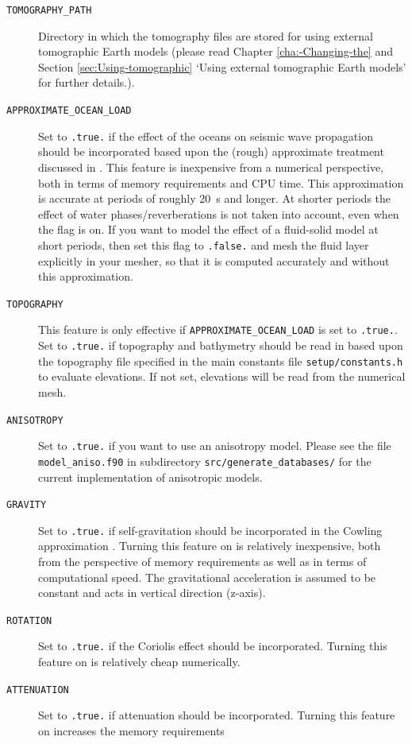 \begin{description}
\item [{\texttt{TOMOGRAPHY\_PATH}}] Directory in which the tomography files
are stored for using external tomographic Earth models (please read
Chapter \ref{cha:-Changing-the} and Section \ref{sec:Using-tomographic}
`Using external tomographic Earth models' for further details.).
%
\item [{\texttt{APPROXIMATE\_OCEAN\_LOAD}}] Set to \texttt{.true.} if the
effect of the oceans on seismic wave propagation should be incorporated
based upon the (rough) approximate treatment discussed in \citet{KoTr02b}.
This feature is inexpensive from a numerical perspective, both in
terms of memory requirements and CPU time. This approximation is accurate
at periods of roughly 20~s and longer. At shorter periods the effect
of water phases/reverberations is not taken into account, even when
the flag is on. If you want to model the effect of a fluid-solid model
at short periods, then set this flag to \texttt{.false.} and mesh
the fluid layer explicitly in your mesher, so that it is computed
accurately and without this approximation.
%
\item [{\texttt{TOPOGRAPHY}}] This feature is only effective if \texttt{APPROXIMATE\_OCEAN\_LOAD}
is set to \texttt{.true.}. Set to \texttt{.true.} if topography and
bathymetry should be read in based upon the topography file specified
in the main constants file \texttt{setup/constants.h} to evaluate elevations. If not set, elevations
will be read from the numerical mesh.
%
\item [{\texttt{ANISOTROPY}}] Set to \texttt{.true.} if you want to use
an anisotropy model. Please see the file \texttt{model\_aniso.f90}
in subdirectory \texttt{src/generate\_databases/} for the current
implementation of anisotropic models.
%
\item [{\texttt{GRAVITY}}] Set to \texttt{.true.} if self-gravitation should
be incorporated in the Cowling approximation \citep{KoTr02b,DaTr98}.
Turning this feature on is relatively inexpensive, both from the perspective
of memory requirements as well as in terms of computational speed.
The gravitational acceleration is assumed to be constant and acts in vertical direction (z-axis).
%
\item [{\texttt{ROTATION}}] Set to \texttt{.true.} if the Coriolis effect
should be incorporated. Turning this feature on is relatively cheap
numerically.
%
\item [{\texttt{ATTENUATION}}] Set to \texttt{.true.} if attenuation should
be incorporated. Turning this feature on increases the memory requirements

\end{description}
